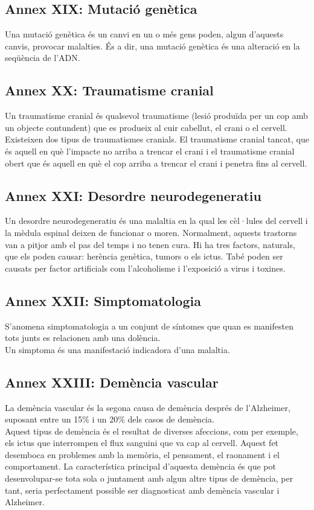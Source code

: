 \documentclass[a4paper,12pt]{article}
\begin{document}
\subsection*{Annex XIX: Mutació genètica}
Una mutació genètica és un canvi en un o més gens poden, algun d'aquests canvis, provocar malalties. És a dir, una mutació genètica és una alteració en la seqüència de l'ADN.
\subsection*{Annex XX: Traumatisme cranial}
Un traumatisme cranial és qualsevol traumatisme (lesió produïda per un cop amb un objecte contundent)
 que es produeix al cuir cabellut, el crani o el cervell. Existeixen dos tipus de traumatismes cranials. El traumatisme cranial tancat, que és aquell en què l'impacte no arriba a trencar el crani i el traumatisme cranial obert que és aquell en què el cop arriba a trencar el crani i penetra fins al cervell.
\subsection*{Annex XXI: Desordre neurodegeneratiu}
Un desordre neurodegeneratiu és una malaltia en la qual les cèl·lules del cervell i la mèdula espinal deixen de funcionar o moren. Normalment, aquests trastorns van a pitjor amb el pas del temps i no tenen cura. Hi ha tres factors, naturals, que els poden causar: herència genètica, tumors o els ictus. Tabé poden ser causats per factor artificials com l'alcoholisme i l'exposició a virus i toxines.
\subsection*{Annex XXII: Simptomatologia}
S'anomena simptomatologia a un conjunt de síntomes que quan es manifesten tots junts es relacionen amb una dolència.\\
Un simptoma és una manifestació indicadora d'una malaltia.
\subsection*{Annex XXIII: Demència vascular}
La demència vascular és la segona causa de demència després de l'Alzheimer, suposant entre un 15\% i un 20\% dels casos de demència.\\
Aquest tipus de demència és el resultat de diverses afeccions, com per exemple, els ictus que interrompen el flux sanguini que va cap al cervell. Aquest fet desemboca en problemes amb la memòria, el pensament, el raonament i el comportament. La característica principal d'aquesta demència és que pot desenvolupar-se tota sola o juntament amb algun altre tipus de demència, per tant, seria perfectament possible ser diagnosticat amb demència vascular i Alzheimer.
\end{document}

